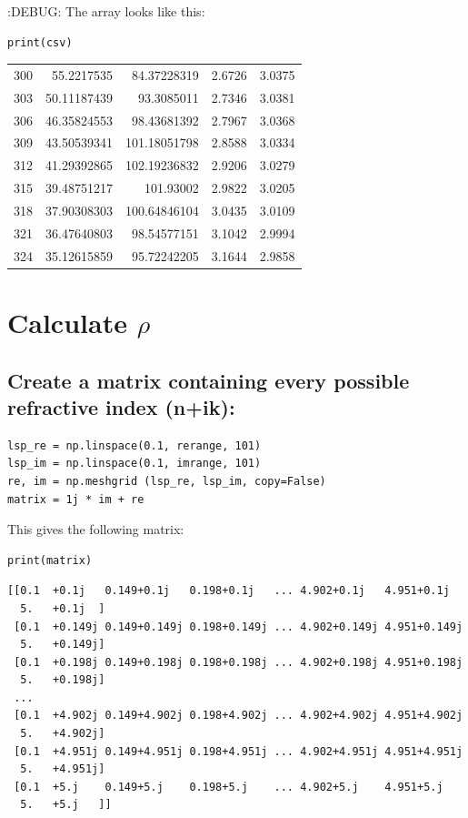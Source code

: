 \documentclass[11pt]{article}
\begin{document}
:DEBUG:
The array looks like this:
\begin{verbatim}
print(csv)
\end{verbatim}
\begin{center}
\begin{tabular}{rrrrr}
300 & 55.2217535 & 84.37228319 & 2.6726 & 3.0375\\
303 & 50.11187439 & 93.3085011 & 2.7346 & 3.0381\\
306 & 46.35824553 & 98.43681392 & 2.7967 & 3.0368\\
309 & 43.50539341 & 101.18051798 & 2.8588 & 3.0334\\
312 & 41.29392865 & 102.19236832 & 2.9206 & 3.0279\\
315 & 39.48751217 & 101.93002 & 2.9822 & 3.0205\\
318 & 37.90308303 & 100.64846104 & 3.0435 & 3.0109\\
321 & 36.47640803 & 98.54577151 & 3.1042 & 2.9994\\
324 & 35.12615859 & 95.72242205 & 3.1644 & 2.9858\\
\end{tabular}
\end{center}

\section{Calculate \(\rho\)}
\label{sec:org7a5acd2}
\subsection{Create a matrix containing every possible refractive index (n+ik):}
\label{sec:org77978a0}
\begin{verbatim}
lsp_re = np.linspace(0.1, rerange, 101)
lsp_im = np.linspace(0.1, imrange, 101)
re, im = np.meshgrid (lsp_re, lsp_im, copy=False)
matrix = 1j * im + re
\end{verbatim}

This gives the following matrix:
\begin{verbatim}
print(matrix)
\end{verbatim}

\begin{verbatim}
[[0.1  +0.1j   0.149+0.1j   0.198+0.1j   ... 4.902+0.1j   4.951+0.1j
  5.   +0.1j  ]
 [0.1  +0.149j 0.149+0.149j 0.198+0.149j ... 4.902+0.149j 4.951+0.149j
  5.   +0.149j]
 [0.1  +0.198j 0.149+0.198j 0.198+0.198j ... 4.902+0.198j 4.951+0.198j
  5.   +0.198j]
 ...
 [0.1  +4.902j 0.149+4.902j 0.198+4.902j ... 4.902+4.902j 4.951+4.902j
  5.   +4.902j]
 [0.1  +4.951j 0.149+4.951j 0.198+4.951j ... 4.902+4.951j 4.951+4.951j
  5.   +4.951j]
 [0.1  +5.j    0.149+5.j    0.198+5.j    ... 4.902+5.j    4.951+5.j
  5.   +5.j   ]]
\end{verbatim}
\end{document}
